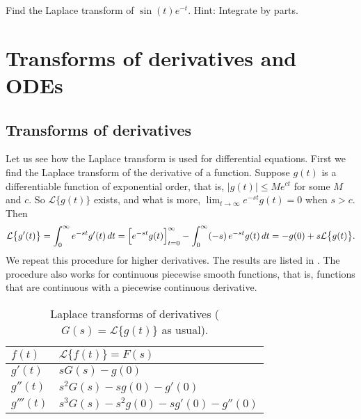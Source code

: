 \begin{exercise}
Find the Laplace transform of $\sin(t)e^{-t}$.  Hint: Integrate by parts.
\end{exercise}



\sectionnewpage
\section{Transforms of derivatives and ODEs}
\label{transformsofders:section}


\subsection{Transforms of derivatives}

Let us see how the Laplace transform is used for differential equations.
First we find the Laplace transform of the derivative of a function.
Suppose $g(t)$ is a differentiable function
of exponential order, that is, $\lvert g(t) \rvert \leq M e^{ct}$ for some
$M$ and $c$.  So $\mathcal{L} \bigl\{ g(t) \bigr\}$ exists, and what is more,
$\lim_{t\to\infty} e^{-st}g(t) = 0$ when $s > c$.  Then
\begin{equation*}
\mathcal{L} \bigl\{ g'(t) \bigr\}
=
\int_0^\infty
e^{-st}
g'(t) \,dt
=
\Bigl[e^{-st} g(t) \Bigr]_{t=0}^\infty
-
\int_0^\infty
(-s)\,
e^{-st}
g(t) \,dt
=
-g(0) + s \mathcal{L} \bigl\{ g(t) \bigr\} .
\end{equation*}
We repeat this procedure for higher derivatives.
The results are
listed in .  The procedure also works for continuous piecewise
smooth functions, that is, functions that are continuous with a
piecewise continuous derivative.

\begin{table}[h!t]
\mybeginframe
\capstart
\begin{center}
\begin{tabular}{@{}ll@{}}
\toprule
$f(t)$ & $\mathcal{L} \bigl\{ f(t) \bigr\} = F(s)$ \\
\midrule
$g'(t)$ & $sG(s)-g(0)$ \\[4pt]
$g''(t)$ & $s^2G(s)-sg(0)-g'(0)$ \\[4pt]
$g'''(t)$ & $s^3G(s)-s^2g(0)-sg'(0)-g''(0)$ \\[4pt]
\bottomrule
\end{tabular}
\end{center}
\caption{Laplace transforms of derivatives
($G(s) = \mathcal{L} \bigl\{ g(t) \bigr\}$
as usual).\label{ltd:table}}
\myendframe
\end{table}


